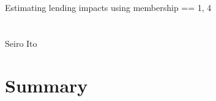\setlength{\baselineskip}{12pt}








\hfil Estimating lending impacts using \textsf{membership} == 1, 4\\

\hfil\MonthDY\\
\hfil{\footnotesize\currenttime}\\

\hfil Seiro Ito

\setcounter{tocdepth}{3}
\tableofcontents
\newpage

\setlength{\parindent}{1em}
\vspace{2ex}



\section{Summary}

